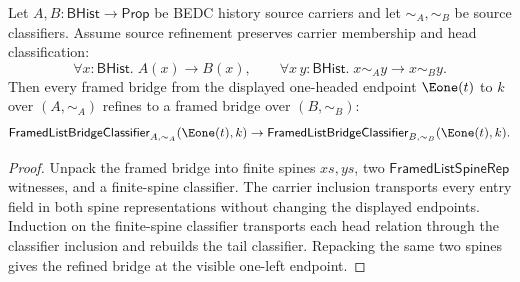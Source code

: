 \begin{theorem}
\label{thm:framed-list-bridge-e1-left-source-refinement}
Let $A,B:\mathsf{BHist}\to\mathsf{Prop}$ be BEDC history source carriers and
let $\sim_A,\sim_B$ be source classifiers. Assume source refinement preserves
carrier membership and head classification:
$$
\forall x:\mathsf{BHist}.\; A(x)\to B(x),
\qquad
\forall x\,y:\mathsf{BHist}.\; x\sim_A y\to x\sim_B y.
$$
Then every framed bridge from the displayed one-headed endpoint $\Eone(t)$ to
$k$ over $(A,\sim_A)$ refines to a framed bridge over $(B,\sim_B)$:
$$
\mathsf{FramedListBridgeClassifier}_{A,\sim_A}(\Eone(t),k)
\to
\mathsf{FramedListBridgeClassifier}_{B,\sim_B}(\Eone(t),k).
$$
\end{theorem}
\begin{proof}
Unpack the framed bridge into finite spines $xs,ys$, two
$\mathsf{FramedListSpineRep}$ witnesses, and a finite-spine classifier. The
carrier inclusion transports every entry field in both spine representations
without changing the displayed endpoints. Induction on the finite-spine
classifier transports each head relation through the classifier inclusion and
rebuilds the tail classifier. Repacking the same two spines gives the refined
bridge at the visible one-left endpoint.
\end{proof}
